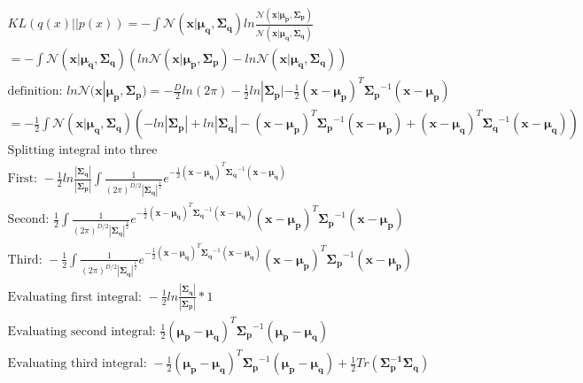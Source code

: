 \begin{gather}
  KL(q(x)||p(x)) = -\int \mathcal{N}(\mathbf{x} | \mathbf{\mu_q}, \mathbf{\Sigma_q}) ln {\frac{\mathcal{N}(\mathbf{x} | \mathbf{\mu_p}, \mathbf{\Sigma_p})}{\mathcal{N}(\mathbf{x} | \mathbf{\mu_q}, \mathbf{\Sigma_q})}} \\
  = -\int \mathcal{N}(\mathbf{x} | \mathbf{\mu_q}, \mathbf{\Sigma_q}) (ln \mathcal{N}(\mathbf{x} | \mathbf{\mu_p}, \mathbf{\Sigma_p}) - ln \mathcal{N}(\mathbf{x} | \mathbf{\mu_q}, \mathbf{\Sigma_q})) \\
  \text{definition: } ln \mathcal{N}(\mathbf{x} | \mathbf{\mu_p}, \mathbf{\Sigma_p}) = -\frac{D}{2}ln(2\pi) - \frac{1}{2} ln | \mathbf{\Sigma_p} | - \frac{1}{2} (\mathbf{x}-\mathbf{\mu_p})^T\mathbf{\Sigma_p}^{-1}(\mathbf{x}-\mathbf{\mu_p}) \\
  = - \frac{1}{2}\int \mathcal{N}(\mathbf{x} | \mathbf{\mu_q}, \mathbf{\Sigma_q}) (-ln |\mathbf{\Sigma_p}| + ln |\mathbf{\Sigma_q}| - (\mathbf{x}-\mathbf{\mu_p})^T\mathbf{\Sigma_p}^{-1}(\mathbf{x}-\mathbf{\mu_p}) + (\mathbf{x}-\mathbf{\mu_q})^T\mathbf{\Sigma_q}^{-1}(\mathbf{x}-\mathbf{\mu_q}) ) \\
  \text{Splitting integral into three} \\
  \text{First: } - \frac{1}{2} ln \frac{|\mathbf{\Sigma_q}|}{|\mathbf{\Sigma_p}|} \int \frac{1}{(2\pi)^{D/2}|\mathbf{\Sigma_q}|^\frac{1}{2}}e^{-\frac{1}{2}(\mathbf{x}-\mathbf{\mu_q})^T\mathbf{\Sigma_q}^{-1}(\mathbf{x}-\mathbf{\mu_q})}  \\
  \text{Second: } \frac{1}{2}\int \frac{1}{(2\pi)^{D/2}|\mathbf{\Sigma_q}|^\frac{1}{2}}e^{-\frac{1}{2}(\mathbf{x}-\mathbf{\mu_q})^T\mathbf{\Sigma_q}^{-1}(\mathbf{x}-\mathbf{\mu_q})} (\mathbf{x}-\mathbf{\mu_p})^T\mathbf{\Sigma_p}^{-1}(\mathbf{x}-\mathbf{\mu_p}) \\
  \text{Third: } -\frac{1}{2}\int  \frac{1}{(2\pi)^{D/2}|\mathbf{\Sigma_q}|^\frac{1}{2}}e^{-\frac{1}{2}(\mathbf{x}-\mathbf{\mu_q})^T\mathbf{\Sigma_q}^{-1}(\mathbf{x}-\mathbf{\mu_q})} (\mathbf{x}-\mathbf{\mu_p})^T\mathbf{\Sigma_p}^{-1}(\mathbf{x}-\mathbf{\mu_p}) \\
  \text{Evaluating first integral: } - \frac{1}{2} ln \frac{|\mathbf{\Sigma_q}|}{|\mathbf{\Sigma_p}|} * 1 \\
  \text{Evaluating second integral: } \frac{1}{2}(\mathbf{\mu_p}-\mathbf{\mu_q})^T\mathbf{\Sigma_p}^{-1}(\mathbf{\mu_p}-\mathbf{\mu_q}) \\
  \text{Evaluating third integral: } - \frac{1}{2}(\mathbf{\mu_p}-\mathbf{\mu_q})^T\mathbf{\Sigma_p}^{-1}(\mathbf{\mu_p}-\mathbf{\mu_q}) + \frac{1}{2} Tr(\mathbf{\Sigma_p^{-1} \Sigma_q})
\end{gather}

